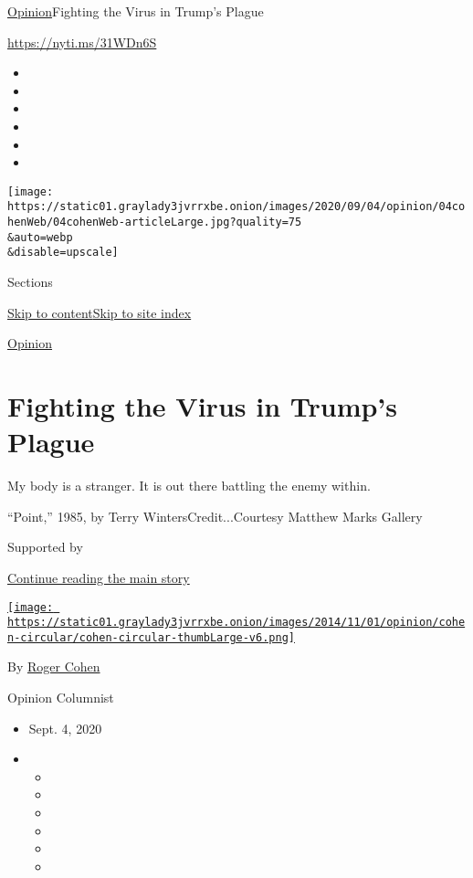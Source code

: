 \href{/section/opinion}{Opinion}\textbar{}Fighting the Virus in Trump's
Plague

\url{https://nyti.ms/31WDn6S}

\begin{itemize}
\item
\item
\item
\item
\item
\item
\end{itemize}

\texttt{[image: https://static01.graylady3jvrrxbe.onion/images/2020/09/04/opinion/04cohenWeb/04cohenWeb-articleLarge.jpg?quality=75\\\&auto=webp\\\&disable=upscale]}

Sections

\protect\hyperlink{site-content}{Skip to
content}\protect\hyperlink{site-index}{Skip to site index}

\href{/section/opinion}{Opinion}

\hypertarget{fighting-the-virus-in-trumps-plague}{%
\section{Fighting the Virus in Trump's
Plague}\label{fighting-the-virus-in-trumps-plague}}

My body is a stranger. It is out there battling the enemy within.

``Point,'' 1985, by Terry WintersCredit...Courtesy Matthew Marks Gallery

Supported by

\protect\hyperlink{after-sponsor}{Continue reading the main story}

\href{https://www.nytimes3xbfgragh.onion/by/roger-cohen}{\texttt{[image: https://static01.graylady3jvrrxbe.onion/images/2014/11/01/opinion/cohen-circular/cohen-circular-thumbLarge-v6.png]}}

By \href{https://www.nytimes3xbfgragh.onion/by/roger-cohen}{Roger Cohen}

Opinion Columnist

\begin{itemize}
\item
  Sept. 4, 2020
\item
  \begin{itemize}
  \item
  \item
  \item
  \item
  \item
  \item
  \end{itemize}
\end{itemize}

